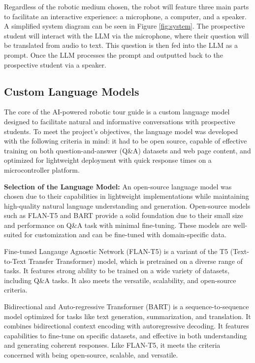 \documentclass[conference]{IEEEtran}
\begin{document}
Regardless of the robotic medium chosen, the robot will feature three main parts to facilitate an interactive experience: a microphone, a computer, and a speaker. 
A simplified system diagram can be seen in Figure \ref{fig:system}. The prospective student will interact with the LLM via the microphone, where their question will be translated from audio to text.
This question is then fed into the LLM as a prompt. Once the LLM processes the prompt and outputted back to the prospective student via a speaker.

\subsection{Custom Language Models}
The core of the AI-powered robotic tour guide is a custom language model designed to facilitate natural and informative conversations with prospective students. 
To meet the project's objectives, the language model was developed with the following criteria in mind: it had to be open source, capable of effective training on both question-and-answer (Q\&A) datasets and web page content, and optimized for lightweight deployment with quick response times on a microcontroller platform.

\noindent
\textbf{Selection of the Language Model:} 
An open-source language model was chosen due to their capabilities in lightweight implementations while maintaining high-quality natural language understanding and generation.
Open-source models such as FLAN-T5 \cite{b6} and BART \cite{b7} provide a solid foundation due to their small size and performance on Q\&A task with minimal fine-tuning. 
These models are well-suited for customization and can be fine-tuned with domain-specific data.

Fine-tuned Langauge Agnostic Network (FLAN-T5) is a variant of the T5 (Text-to-Text Transfer Transformer) model, which is pretrained on a diverse range of tasks. 
It features strong ability to be trained on a wide variety of datasets, including Q\&A tasks. 
It also meets the versatile, scalability, and open-source criteria.

Bidirectional and Auto-regressive Transformer (BART) is a sequence-to-sequence model optimized for tasks like text generation, summarization, and translation. 
It combines bidirectional context encoding with autoregressive decoding. 
It features capabilities to fine-tune on specific datasets, and effective in both understanding and generating coherent responses.
Like FLAN-T5, it meets the criteria concerned with being open-source, scalable, and versatile.
\end{document}
